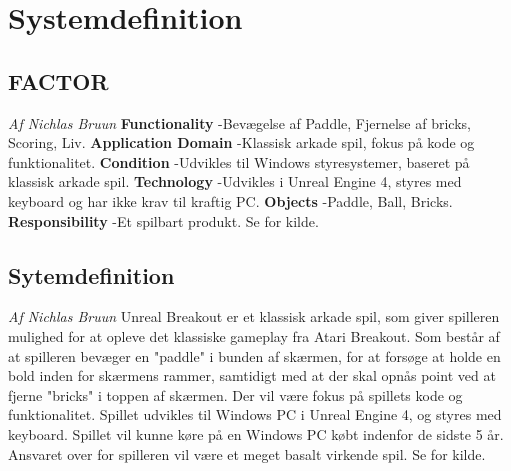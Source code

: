 
\section{Systemdefinition}
\subsection{FACTOR}
\textit{Af Nichlas Bruun}\newline
\textbf{Functionality}
\newline
-Bevægelse af Paddle, Fjernelse af bricks, Scoring, Liv.
\newline
\textbf{Application Domain}
\newline
-Klassisk arkade spil, fokus på kode
og funktionalitet.
\newline
\textbf{Condition}\newline
-Udvikles til Windows styresystemer, baseret på klassisk arkade spil.
\newline
\textbf{Technology}\newline
-Udvikles i Unreal Engine 4, styres med keyboard og har ikke krav
til kraftig PC.
\newline
\textbf{Objects}\newline
-Paddle, Ball, Bricks.
\newline
\textbf{Responsibility}\newline
-Et spilbart produkt.\newline
\newline
Se \cite[chap. 2.7]{Mathiassen200006} for kilde.

\subsection{Sytemdefinition}
\textit{Af Nichlas Bruun}\newline
Unreal Breakout er et klassisk arkade spil, som giver spilleren mulighed for at opleve det klassiske gameplay fra Atari Breakout. Som består af at spilleren bevæger en "paddle" i bunden af skærmen, for at forsøge at holde en bold inden for skærmens rammer, samtidigt med at der skal opnås point ved at fjerne "bricks" i toppen af skærmen.
Der vil være fokus på spillets kode og funktionalitet. Spillet udvikles til Windows PC
i Unreal Engine 4, og styres med keyboard. Spillet vil kunne køre på en Windows PC købt indenfor de sidste 5 år.
Ansvaret over for spilleren vil være et meget basalt virkende spil. \newline \newline
Se \cite[chap. 2.1]{Mathiassen200006} for kilde.
